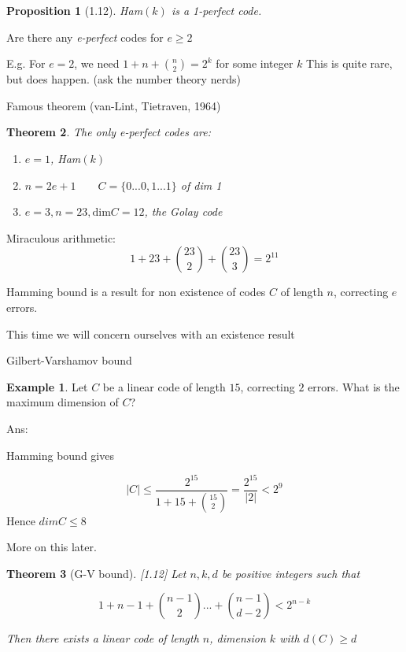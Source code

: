 \documentclass[]{article}
\newtheorem{thm}{Theorem}[section]
\newtheorem{prop}[thm]{Proposition}
\theoremstyle{definition}
\newtheorem*{exmp}{Example}
\theoremstyle{remark}
\numberwithin{equation}{section}
\begin{document}
		\begin{prop}[1.12]
			Ham$(k)$ is a 1-perfect code.
		\end{prop}

		Are there any \emph{e-perfect} codes for $e\geq2$

		E.g.\newline
		For $e=2$, we need $1+n + {n \choose 2} = 2^k$ for some integer $k$ \newline
		This is quite rare, but does happen. (ask the number theory nerds)
		\par
		Famous theorem (van-Lint, Tietraven, 1964)

		\begin{thm}
		The only \emph{e-perfect} codes are:
			\begin{enumerate}
				\item $e=1$, Ham$(k)$
				\item $n=2e+1\qquad C=\{0 ... 0, 1 ... 1\}$ of dim 1
				\item $e=3, n=23, \text{dim}C = 12$, the \em{Golay code}
			\end{enumerate}

		\end{thm}
		Miraculous arithmetic:\newline
		\[
			1 + 23 + {23 \choose 2} + {23 \choose 3} = 2^{11}
		\]

		Hamming bound is a result for non existence of codes $C$ of length $n$, correcting $e$ errors.

		This time we will concern ourselves with an existence result


		Gilbert-Varshamov bound

		\begin{exmp}
		Let $C$ be a linear code of length $15$, correcting $2$ errors. What is the maximum dimension of $C$?

		Ans:

		Hamming bound gives

		\[
			|C| \leq \frac{2^15}{1+15 +{15 \choose 2}} = \frac{2^15}{|2|} < 2^9
		\]
		Hence $dimC \leq 8$

		More on this later.
		\end{exmp}

		\begin{thm}[G-V bound][1.12]
		Let $n,k, d$ be positive integers such that

		\[
			1 + n-1 + {n-1 \choose 2} ... + {n-1 \choose d-2} < 2^{n-k}
		\]

		Then there exists a linear code of length $n$, dimension $k$ with $d(C) \geq d$
		\end{thm}
\end{document}
